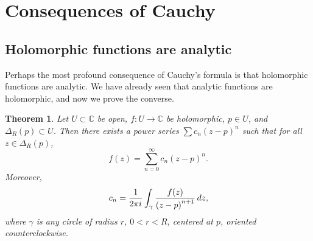 \documentclass[12pt,openany]{book}
\newcommand{\avoidbreak}{\postdisplaypenalty=100}
\newcommand{\C}{{\mathbb{C}}}
\theoremstyle{plain}
\newtheorem{thm}{Theorem}[section]
\theoremstyle{remark}
\theoremstyle{definition}
\theoremstyle{exercise}
\theoremstyle{example}
\begin{document}

\section{Consequences of Cauchy}
\label{sec:consequencescauchy}

\subsection{Holomorphic functions are analytic}

Perhaps the most profound consequence of Cauchy's formula is
that holomorphic functions are analytic.  We have already seen
that analytic functions are holomorphic, and now we prove the converse.

\begin{thm} \label{thm:holpower}
Let $U \subset \C$ be open, $f \colon U \to \C$ be
holomorphic, $p \in U$, and $\Delta_R(p) \subset U$.
Then there exists a power series $\sum c_n {(z-p)}^n$
such that for all $z \in \Delta_R(p)$,
\begin{equation*}
f(z) = \sum_{n=0}^\infty c_n {(z-p)}^n .
\end{equation*}
Moreover,
\begin{equation*}
c_n = 
\frac{1}{2\pi i}
\int_{\gamma}
\frac{f(z)}{{(z-p)}^{n+1}}
\,
dz  ,
\avoidbreak
\end{equation*}
where $\gamma$ is any circle of radius $r$, $0 < r < R$, centered at
$p$, oriented counterclockwise.
\end{thm}
\end{document}
